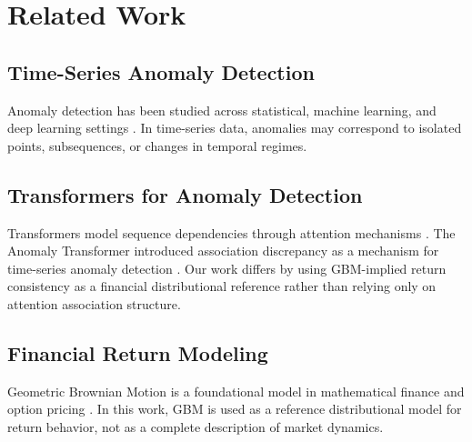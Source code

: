 \section{Related Work}

\subsection{Time-Series Anomaly Detection}

Anomaly detection has been studied across statistical, machine learning, and deep learning settings \citep{chandola2009anomaly,pang2021deep}. In time-series data, anomalies may correspond to isolated points, subsequences, or changes in temporal regimes.

\subsection{Transformers for Anomaly Detection}

Transformers model sequence dependencies through attention mechanisms \citep{vaswani2017attention}. The Anomaly Transformer introduced association discrepancy as a mechanism for time-series anomaly detection \citep{xu2022anomaly}. Our work differs by using GBM-implied return consistency as a financial distributional reference rather than relying only on attention association structure.

\subsection{Financial Return Modeling}

Geometric Brownian Motion is a foundational model in mathematical finance and option pricing \citep{merton1973theory,hull2018options}. In this work, GBM is used as a reference distributional model for return behavior, not as a complete description of market dynamics.

